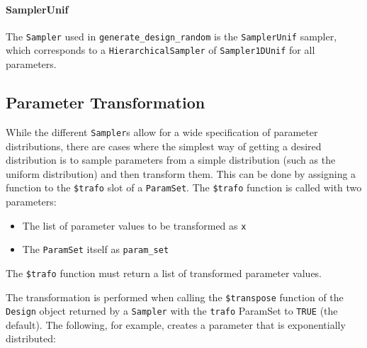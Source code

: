 \documentclass[
  11pt,
  parskip=half,
  DIV=calc,
  BCOR=10mm,
  x11names]{scrbook}
\providecommand{\tightlist}{%
  \setlength{\itemsep}{0pt}\setlength{\parskip}{0pt}}
\begin{document}
\hypertarget{samplerunif}{%
\paragraph{SamplerUnif}\label{samplerunif}}

The \texttt{Sampler} used in \texttt{generate\_design\_random} is the \texttt{SamplerUnif} sampler, which corresponds to a \texttt{HierarchicalSampler} of \texttt{Sampler1DUnif} for all parameters.

\hypertarget{parameter-transformation}{%
\subsection{Parameter Transformation}\label{parameter-transformation}}

While the different \texttt{Sampler}s allow for a wide specification of parameter distributions, there are cases where the simplest way of getting a desired distribution is to sample parameters from a simple distribution (such as the uniform distribution) and then transform them.
This can be done by assigning a function to the \texttt{\$trafo} slot of a \texttt{ParamSet}.
The \texttt{\$trafo} function is called with two parameters:

\begin{itemize}
\tightlist
\item
  The list of parameter values to be transformed as \texttt{x}
\item
  The \texttt{ParamSet} itself as \texttt{param\_set}
\end{itemize}

The \texttt{\$trafo} function must return a list of transformed parameter values.

The transformation is performed when calling the \texttt{\$transpose} function of the \texttt{Design} object returned by a \texttt{Sampler} with the \texttt{trafo} ParamSet to \texttt{TRUE} (the default).
The following, for example, creates a parameter that is exponentially distributed:
\end{document}
